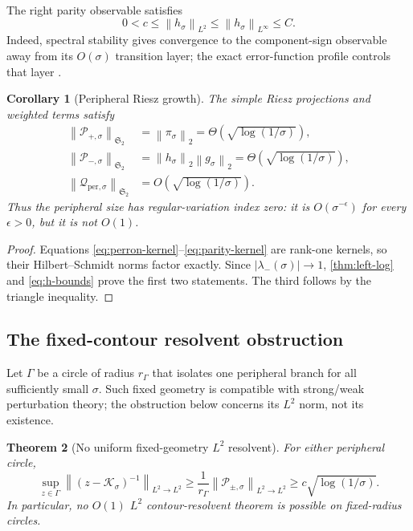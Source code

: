 \documentclass[11pt]{article}
\newtheorem{theorem}{Theorem}[section]
\newtheorem{corollary}[theorem]{Corollary}
\theoremstyle{remark}
\newcommand{\cK}{\mathcal K}
\newcommand{\cQ}{\mathcal Q}
\newcommand{\cP}{\mathcal P}
\newcommand{\norm}[1]{\left\lVert#1\right\rVert}
\newcommand{\HS}{\mathfrak S_2}
\newcommand{\Qper}{\cQ_{\mathrm{per},\sigma}}
\begin{document}
The right parity observable satisfies
\begin{equation}
 0<c\le\norm{h_\sigma}_{L^2}\le
 \norm{h_\sigma}_{L^\infty}\le C.
 \label{eq:h-bounds}
\end{equation}
Indeed, spectral stability gives convergence to the component-sign
observable away from its $O(\sigma)$ transition layer; the exact
error-function profile controls that layer \citep{WangBoundaryLayer2026}.

\begin{corollary}[Peripheral Riesz growth]
\label{cor:projector-log}
The simple Riesz projections and weighted terms satisfy
\begin{align}
 \norm{\cP_{+,\sigma}}_{\HS}
 &=\norm{\pi_\sigma}_2
 =\Theta(\sqrt{\log(1/\sigma)}),
 \label{eq:perron-projector-log}\\
 \norm{\cP_{-,\sigma}}_{\HS}
 &=\norm{h_\sigma}_2\norm{g_\sigma}_2
 =\Theta(\sqrt{\log(1/\sigma)}),
 \label{eq:parity-projector-log}\\
 \norm{\Qper}_{\HS}
 &=O(\sqrt{\log(1/\sigma)}).
 \label{eq:qper-log}
\end{align}
Thus the peripheral size has regular-variation index zero: it is
$O(\sigma^{-\epsilon})$ for every $\epsilon>0$, but it is not $O(1)$.
\end{corollary}

\begin{proof}
Equations \eqref{eq:perron-kernel}--\eqref{eq:parity-kernel} are rank-one
kernels, so their Hilbert--Schmidt norms factor exactly.  Since
$|\lambda_-(\sigma)|\to1$, \cref{thm:left-log} and
\eqref{eq:h-bounds} prove the first two statements.  The third follows by
the triangle inequality.
\end{proof}

\subsection{The fixed-contour resolvent obstruction}

Let $\Gamma$ be a circle of radius $r_\Gamma$ that isolates one peripheral
branch for all sufficiently small $\sigma$.  Such fixed geometry is
compatible with strong/weak perturbation theory; the obstruction below
concerns its $L^2$ norm, not its existence.

\begin{theorem}[No uniform fixed-geometry $L^2$ resolvent]
\label{thm:resolvent-lower}
For either peripheral circle,
\begin{equation}
 \sup_{z\in\Gamma}\norm{(z-\cK_\sigma)^{-1}}_{L^2\to L^2}
 \ge
 \frac{1}{r_\Gamma}\norm{\cP_{\pm,\sigma}}_{L^2\to L^2}
 \ge c\sqrt{\log(1/\sigma)}.
 \label{eq:resolvent-lower}
\end{equation}
In particular, no $O(1)$ $L^2$ contour-resolvent theorem is possible on
fixed-radius circles.
\end{theorem}
\end{document}
